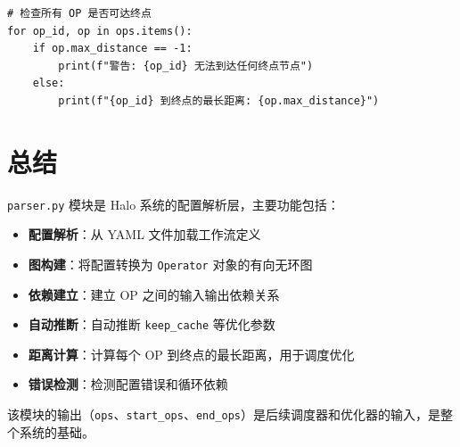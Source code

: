 \documentclass[12pt,a4paper]{article}
\begin{document}
\begin{lstlisting}
# 检查所有 OP 是否可达终点
for op_id, op in ops.items():
    if op.max_distance == -1:
        print(f"警告: {op_id} 无法到达任何终点节点")
    else:
        print(f"{op_id} 到终点的最长距离: {op.max_distance}")
\end{lstlisting}

\section{总结}

\texttt{parser.py} 模块是 Halo 系统的配置解析层，主要功能包括：

\begin{itemize}
    \item \textbf{配置解析}：从 YAML 文件加载工作流定义
    \item \textbf{图构建}：将配置转换为 \texttt{Operator} 对象的有向无环图
    \item \textbf{依赖建立}：建立 OP 之间的输入输出依赖关系
    \item \textbf{自动推断}：自动推断 \texttt{keep\_cache} 等优化参数
    \item \textbf{距离计算}：计算每个 OP 到终点的最长距离，用于调度优化
    \item \textbf{错误检测}：检测配置错误和循环依赖
\end{itemize}

该模块的输出（\texttt{ops}、\texttt{start\_ops}、\texttt{end\_ops}）是后续调度器和优化器的输入，是整个系统的基础。
\end{document}
